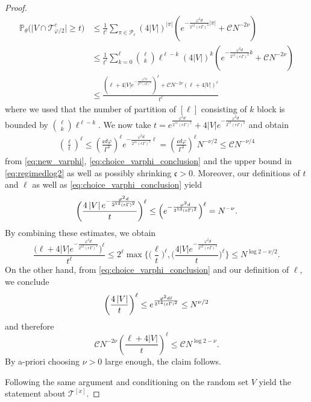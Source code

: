 \documentclass[10pt,a4paper]{amsart}
\newcommand{\abs}[1]{\left| #1 \right|}
\newcommand{\absn}[1]{\bigl| #1 \bigr|} %
\newcommand{\ccc}{\mathfrak{c}}
\numberwithin{equation}{section}
\newcommand{\nc}{\normalcolor}
\begin{document}
\begin{proof}
		\begin{align*}
			\mathbb{P}_{\theta} \big( \absn{V\cap \mathcal{T}_{\varphi/2}^c} \ge t \big) &\le \frac{1}{t^{\ell}} \sum_{\pi \in \mathcal{P}_{\ell}}  (4\abs{V})^{\abs{\pi}} \left(  e^{-\frac{\varphi^2d}{2^{12} (e\Gamma)^2}|\pi|} + \mathcal{C}N^{-2 \nu}\right) \\
		&\le  \frac{1}{t^{\ell}} \sum_{ k=0}^\ell \binom{\ell}{k} \ell^{\ell-k}(4\abs{V})^{k} \left(  e^{-\frac{\varphi^2d}{2^{12} (e\Gamma)^2}k}  + \mathcal{C}N^{- 2\nu}\right)\\
			&\le \frac{ \left( \ell +  4\abs{V} e^{-\frac{\varphi^2d}{2^{12} (e\Gamma)^2}}  \right)^\ell + \mathcal{C} N^{-2\nu}\left(\ell +  4 \abs{V} \right)^\ell}{t^\ell}
		\end{align*}
		where we used that the number of partition of $[\ell]$ consisting of $k$ block is bounded by $\binom{\ell}{k}\ell^{\ell-k}$. We now take $t = e^{\frac{\varphi^2d}{2^{14} (e\Gamma)^2}}  + 4\abs{V} e^{-\frac{\varphi^2d}{2^{13} (e\Gamma)^2}} $ and obtain
		\begin{align*}
			\left( \frac{\ell}{t} \right)^{\ell} \le \left(\frac{\ccc d\varphi}{\Gamma^3}\right)^\ell e^{-\frac{\varphi^2d }{2^{14}(e\Gamma)^2} \ell } = \left(\frac{\ccc d\varphi}{\Gamma^3}\right)^\ell N^{-\nu/2} \le \mathcal C N^{-\nu/4}
		\end{align*}
		 from \cref{eq:new_varphi},  \cref{eq:choice_varphi_conclusion} 
		 and the upper bound in \cref{eq:regimedlog2} as well as possibly shrinking $\ccc>0$. Moreover, our  definitions of $t$ and $\ell$ as well as \cref{eq:choice_varphi_conclusion} yield \begin{align*}
		\biggl(	\frac{ 4\abs{V} e^{-\frac{\varphi^2d}{2^{12} (e\Gamma)^2}} }{t} \biggr)^\ell \le \Bigl(e^{-\frac{\varphi^2d}{2^{13} (e\Gamma)^2}}\Bigr)^\ell = N^{-\nu}.
		\end{align*}
		By combining these estimates, we obtain 
		\begin{equation*}
			\frac{ \big( \ell + 4\abs{V} e^{-\frac{\varphi^2d}{2^{12} (e\Gamma)^2}}  \big)^\ell}{t^\ell} \le 2^\ell \max \bigg\{ \bigg(\frac{\ell}{t}\bigg)^\ell, \bigg( \frac{ 4\abs{V} e^{-\frac{\varphi^2d}{2^{12} (e\Gamma)^2}} }{t}\bigg)^{\ell}\bigg\}  \le N^{ \log 2 - \nu/2}.
		\end{equation*}
		On the other hand, from \cref{eq:choice_varphi_conclusion} and our definition of $\ell$, we conclude 
		\begin{equation*}
			\left( \frac{ 4 \nc \abs{V}}{t} \right)^{\ell} \le e^{\frac{\varphi^2d \ell}{2^{14} (e\Gamma)^2}}  \le N^{\nu/2}
		\end{equation*}
		and therefore
		\begin{equation*}
			\mathcal{C} N^{-2\nu} \left( \frac{\ell + 4\abs{V}}{t}\right)^{\ell}\le \mathcal{C} N^{\log 2 - \nu}.
		\end{equation*}
		By a-priori choosing $\nu>0$ large enough, the claim follows. 
	 
	 Following the same argument and conditioning on the random set $V$ yield the statement about $\mathcal T^{[x]}$.
	\end{proof}
\end{document}

